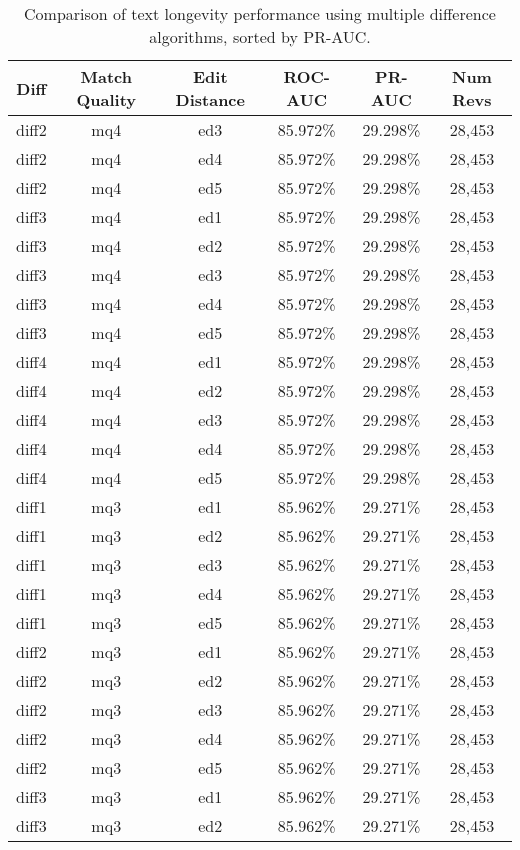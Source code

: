\begin{table}[tbph]
\begin{center}
\begin{tabular}{|c|c|c||c|c|c|}
\hline
Diff & Match Quality & Edit Distance & ROC-AUC & PR-AUC & Num Revs \\
\hline
\hline
diff2 & mq4 & ed3 & 85.972\% & 29.298\% & 28,453 \\
diff2 & mq4 & ed4 & 85.972\% & 29.298\% & 28,453 \\
diff2 & mq4 & ed5 & 85.972\% & 29.298\% & 28,453 \\
diff3 & mq4 & ed1 & 85.972\% & 29.298\% & 28,453 \\
diff3 & mq4 & ed2 & 85.972\% & 29.298\% & 28,453 \\
diff3 & mq4 & ed3 & 85.972\% & 29.298\% & 28,453 \\
diff3 & mq4 & ed4 & 85.972\% & 29.298\% & 28,453 \\
diff3 & mq4 & ed5 & 85.972\% & 29.298\% & 28,453 \\
diff4 & mq4 & ed1 & 85.972\% & 29.298\% & 28,453 \\
diff4 & mq4 & ed2 & 85.972\% & 29.298\% & 28,453 \\
diff4 & mq4 & ed3 & 85.972\% & 29.298\% & 28,453 \\
diff4 & mq4 & ed4 & 85.972\% & 29.298\% & 28,453 \\
diff4 & mq4 & ed5 & 85.972\% & 29.298\% & 28,453 \\
diff1 & mq3 & ed1 & 85.962\% & 29.271\% & 28,453 \\
diff1 & mq3 & ed2 & 85.962\% & 29.271\% & 28,453 \\
diff1 & mq3 & ed3 & 85.962\% & 29.271\% & 28,453 \\
diff1 & mq3 & ed4 & 85.962\% & 29.271\% & 28,453 \\
diff1 & mq3 & ed5 & 85.962\% & 29.271\% & 28,453 \\
diff2 & mq3 & ed1 & 85.962\% & 29.271\% & 28,453 \\
diff2 & mq3 & ed2 & 85.962\% & 29.271\% & 28,453 \\
diff2 & mq3 & ed3 & 85.962\% & 29.271\% & 28,453 \\
diff2 & mq3 & ed4 & 85.962\% & 29.271\% & 28,453 \\
diff2 & mq3 & ed5 & 85.962\% & 29.271\% & 28,453 \\
diff3 & mq3 & ed1 & 85.962\% & 29.271\% & 28,453 \\
diff3 & mq3 & ed2 & 85.962\% & 29.271\% & 28,453 \\
\hline
\end{tabular}
\end{center}
\caption{Comparison of text longevity performance using
    multiple difference algorithms, sorted by PR-AUC.}
\label{tab:textshout}
\end{table}

